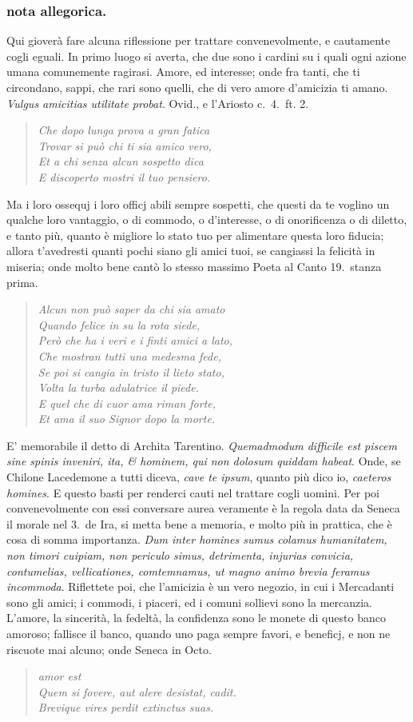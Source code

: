 \documentclass[11pt,a6paper]{article}
\newcommand{\literaryquote}[1]{%
\kern -6pt  \begin{verse}
    {\footnotesize \it #1}
  \end{verse}\kern -2pt%
}
\begin{document}
\subsubsection{nota allegorica.}
{\footnotesize
  Qui gioverà fare alcuna riflessione per trattare
convenevolmente, e cautamente cogli eguali. In
primo luogo si averta, che due sono i cardini su i
quali ogni azione umana comunemente ragirasi.
Amore, ed interesse; onde fra tanti, che ti
circondano, sappi, che rari sono quelli, che di vero
amore d'amicizia ti amano. \textit{Vulgus amicitias utilitate
probat}. Ovid., e l'Ariosto c.\ 4.\ ft. 2.
\literaryquote{
Che dopo lunga prova a gran fatica\\
Trovar si può chi ti sia amico vero,\\
Et a chi senza alcun sospetto dica\\
E discoperto mostri il tuo pensiero.}

Ma i loro ossequj i loro officj abili sempre sospetti,
che questi da te voglino un qualche loro vantaggio,
o di commodo, o d'interesse, o di onorificenza o
di diletto, e tanto più, quanto è migliore lo stato
tuo per alimentare questa loro fiducia; allora
t'avedresti quanti pochi siano gli amici tuoi, se
cangiassi
la felicità in miseria; onde molto bene cantò lo
stesso massimo Poeta al Canto 19.\ stanza prima.
\literaryquote{
Alcun non può saper da chi sia amato\\
Quando felice in su la rota siede,\\
Però che ha i veri e i finti amici a lato,\\
Che mostran tutti una medesma fede, \\
Se poi si cangia in tristo il lieto stato, \\
Volta la turba adulatrice il piede.\\
E quel che di cuor ama riman forte, \\
Et ama il suo Signor dopo la morte.}

E' memorabile il detto di Archita Tarentino.
\textit{Quemadmodum difficile est piscem sine spinis
inveniri, ita, \& hominem, qui non dolosum quiddam
habeat}. Onde, se Chilone Lacedemone a tutti
diceva, \textit{cave te ipsum}, quanto più dico io, \textit{caeteros
homines}. E questo basti per renderci cauti nel trattare
cogli uomini. Per poi convenevolmente con essi
conversare aurea veramente è la regola data da
Seneca il morale nel 3.\ de Ira, si metta bene a
memoria, e molto più in prattica, che è cosa di somma
importanza. \textit{Dum inter homines sumus colamus
humanitatem, non timori cuipiam, non periculo
simus, detrimenta, injurias convicia, contumelias,
vellicationes, comtemnamus, ut magno animo brevia
feramus incommoda}. Riflettete poi, che l'amicizia
è un vero negozio, in cui i Mercadanti sono gli
amici; i commodi, i piaceri, ed i comuni sollievi
sono la mercanzia. L'amore, la sincerità, la fedeltà,
la confidenza sono le monete di questo banco amoroso;
fallisce il banco, quando uno paga sempre favori,
e beneficj, e non ne riscuote mai alcuno; onde
 Seneca in Octo.
\literaryquote{
{\hspace{14em} amor est}\\
Quem si fovere, aut alere desistat, cadit. \\
Brevique vires perdit extinctus suas.}

}
\end{document}
